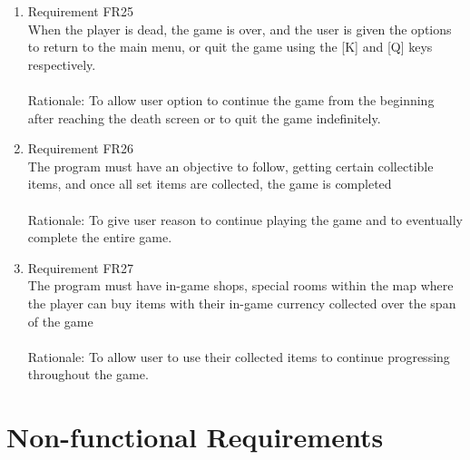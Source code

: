 \documentclass[12pt, titlepage]{article}
\begin{document}
\begin{enumerate}
    \item Requirement FR25\\When the player is dead, the game is over, and the user is given the options to return to the main menu, or quit the game using the [K] and [Q] keys respectively.\\\\
    {\color{blue}Rationale: To allow user option to continue the game from the beginning after reaching the death screen or to quit the game indefinitely. }
    \item Requirement FR26\\The program must have an objective to follow, getting certain collectible items, and once all set items are collected, the game is completed\\\\
    {\color{blue}Rationale: To give user reason to continue playing the game and to eventually complete the entire game. }
    
    \item Requirement FR27\\The program must have in-game shops, special rooms within the map where the player can buy items with their in-game currency collected over the span of the game\\\\
    {\color{blue}Rationale: To allow user to use their collected items to continue progressing throughout the game.}
\end{enumerate}

\section{Non-functional Requirements}
\end{document}
